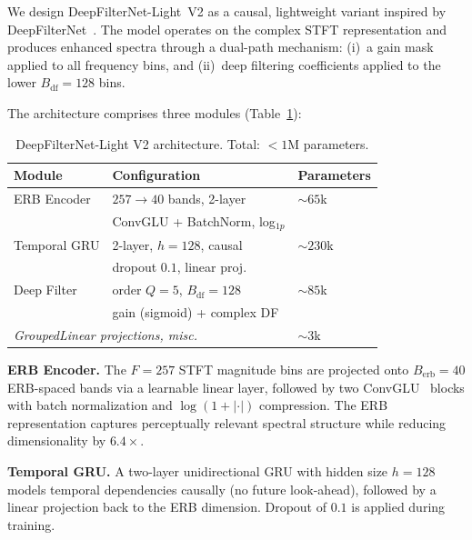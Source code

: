 \documentclass[a4paper]{article}
\begin{document}
We design DeepFilterNet-Light~V2 as a causal, lightweight variant inspired by
DeepFilterNet~\cite{schroeder2020deepfilternet,schroeder2023deepfilternet2}.
The model operates on the complex STFT representation and produces enhanced
spectra through a dual-path mechanism: (i)~a gain mask applied to all
frequency bins, and (ii)~deep filtering coefficients applied to the lower
$B_\text{df}=128$ bins.

The architecture comprises three modules (Table~\ref{tab:arch}):

\begin{table}[t]
\centering
\caption{DeepFilterNet-Light V2 architecture.  Total: $<1$M parameters.}
\label{tab:arch}
\small
\begin{tabular}{@{}lll@{}}
\toprule
\textbf{Module} & \textbf{Configuration} & \textbf{Parameters}\\
\midrule
ERB Encoder & $257\!\to\!40$ bands, 2-layer & $\sim\!65$k \\
 & ConvGLU + BatchNorm, log$_{1p}$ & \\
\midrule
Temporal GRU & 2-layer, $h\!=\!128$, causal & $\sim\!230$k \\
 & dropout $0.1$, linear proj. & \\
\midrule
Deep Filter & order $Q\!=\!5$, $B_\text{df}\!=\!128$ & $\sim\!85$k \\
 & gain (sigmoid) + complex DF & \\
\midrule
\multicolumn{2}{l}{\textit{GroupedLinear projections, misc.}} & $\sim\!3$k \\
\bottomrule
\end{tabular}
\end{table}

\noindent\textbf{ERB Encoder.}
The $F=257$ STFT magnitude bins are projected onto $B_\text{erb}=40$
ERB-spaced bands via a learnable linear layer, followed by two
ConvGLU~\cite{schroeder2020deepfilternet} blocks with batch normalization and
$\log(1+|{\cdot}|)$ compression.  The ERB representation captures perceptually
relevant spectral structure while reducing dimensionality by $6.4\times$.

\noindent\textbf{Temporal GRU.}
A two-layer unidirectional GRU with hidden size $h=128$ models temporal
dependencies causally (no future look-ahead), followed by a linear projection
back to the ERB dimension.  Dropout of $0.1$ is applied during training.
\end{document}
